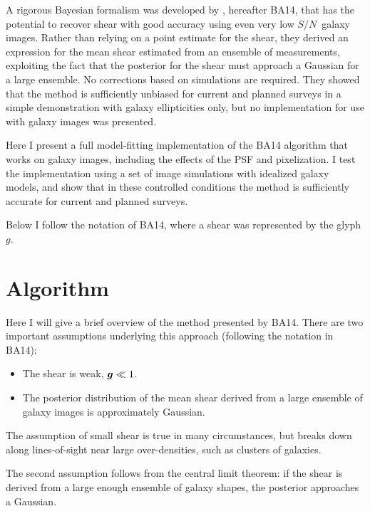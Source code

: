 \documentclass[usegraphicx,usenatbib]{mn2e}
\newcommand{\sn}{$S/N$}
\newcommand{\vecg}{\mbox{\boldmath $g$}}
\begin{document}
A rigorous Bayesian formalism was developed by \cite{ba14}, hereafter BA14,
that has the potential to recover shear with good accuracy using even very low
\sn\ galaxy images.  Rather than relying on a point estimate for the shear,
they derived an expression for the mean shear estimated from an ensemble of
measurements, exploiting the fact that the posterior for the shear must
approach a Gaussian for a large ensemble.  No corrections based on simulations
are required.  They showed that the method is sufficiently unbiased for current
and planned surveys in a simple demonstration with galaxy ellipticities only,
but no implementation for use with galaxy images was presented.

Here I present a full model-fitting implementation of the BA14 algorithm that
works on galaxy images, including the effects of the PSF and pixelization.  I
test the implementation using a set of image simulations with idealized galaxy
models, and show that in these controlled conditions the method is
sufficiently accurate for current and planned surveys.

Below I follow the notation of BA14, where a shear was represented by the
glyph \vecg.

\section{Algorithm} \label{sec:algo}

Here I will give a brief overview of the method presented by BA14.  There are
two important assumptions underlying this approach (following the notation in
BA14):

\begin{itemize}

    \item The shear is weak, $\vecg \ll 1$.

    \item The posterior distribution of the mean shear derived from a large
        ensemble of galaxy images is approximately Gaussian.

\end{itemize}

The assumption of small shear is true in many circumstances, but breaks down
along lines-of-sight near large over-densities, such as clusters of galaxies.

The second assumption follows from the central limit theorem: if the shear is
derived from a large enough ensemble of galaxy shapes, the posterior approaches
a Gaussian.
\end{document}
